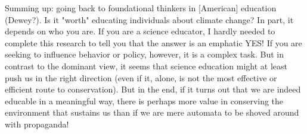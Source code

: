 Summing up: going back to foundational thinkers in [American] education
(Dewey?). Is it "worth" educating individuals about climate change? In part, it
depends on who you are. If you are a science educator, I hardly needed to
complete this research to tell you that the answer is an emphatic YES! If you
are seeking to influence behavior or policy, however, it is a complex task. But
in contrast to the dominant view, it seems that science education might at least
push us in the right direction (even if it, alone, is not the most effective or
efficient route to conservation). But in the end, if it turns out that we are
indeed educable in a meaningful way, there is perhaps more value in conserving
the environment that sustains us than if we are mere automata to be shoved
around with propaganda!
